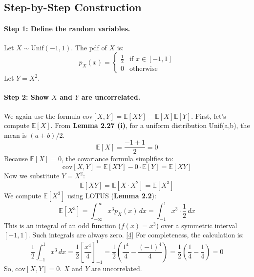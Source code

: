 \documentclass[11pt,a4paper]{article}
\begin{document}
\subsection{Step-by-Step Construction}

\paragraph{Step 1: Define the random variables.}
Let $X \sim \text{Unif}(-1, 1)$. The pdf of $X$ is:
\begin{equation*}
    p_X(x) =
    \begin{cases}
        \frac{1}{2} & \text{if } x \in [-1, 1] \\
        0 & \text{otherwise}
    \end{cases}
\end{equation*}
Let $Y = X^2$.

\paragraph{Step 2: Show $X$ and $Y$ are uncorrelated.}
We again use the formula $\text{cov}[X, Y] = \mathbb{E}[XY] - \mathbb{E}[X]\mathbb{E}[Y]$.
First, let's compute $\mathbb{E}[X]$. From \textbf{Lemma 2.27 (i)}, for a uniform distribution Unif(a,b), the mean is $(a+b)/2$.
\begin{equation*}
    \mathbb{E}[X] = \frac{-1 + 1}{2} = 0
\end{equation*}
Because $\mathbb{E}[X]=0$, the covariance formula simplifies to:
\begin{equation*}
    \text{cov}[X, Y] = \mathbb{E}[XY] - 0 \cdot \mathbb{E}[Y] = \mathbb{E}[XY]
\end{equation*}
Now we substitute $Y=X^2$:
\begin{equation*}
    \mathbb{E}[XY] = \mathbb{E}[X \cdot X^2] = \mathbb{E}[X^3]
\end{equation*}
We compute $\mathbb{E}[X^3]$ using LOTUS (\textbf{Lemma 2.2}):
\begin{equation*}
    \mathbb{E}[X^3] = \int_{-\infty}^{\infty} x^3 p_X(x) \,dx = \int_{-1}^{1} x^3 \cdot \frac{1}{2} \,dx
\end{equation*}
This is an integral of an odd function ($f(x)=x^3$) over a symmetric interval $[-1, 1]$. Such integrals are always zero. \hyperlink{note4}{[4]} For completeness, the calculation is:
\begin{equation*}
    \frac{1}{2} \int_{-1}^{1} x^3 \,dx = \frac{1}{2} \left[ \frac{x^4}{4} \right]_{-1}^{1} = \frac{1}{2} \left( \frac{1^4}{4} - \frac{(-1)^4}{4} \right) = \frac{1}{2} \left( \frac{1}{4} - \frac{1}{4} \right) = 0
\end{equation*}
So, $\text{cov}[X, Y] = 0$. $X$ and $Y$ are uncorrelated.
\end{document}
